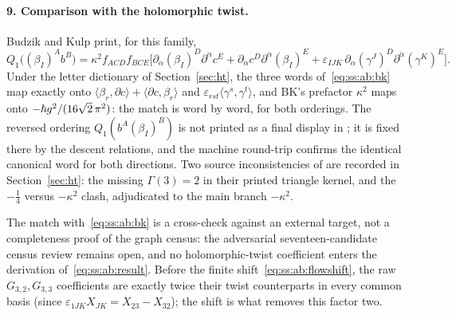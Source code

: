 \paragraph{9. Comparison with the holomorphic twist.} Budzik and Kulp print, for this family, \cite[eq.~(3.68)]{BK}
\begin{equation}\label{eq:ss:ab:bk}
Q_1\big((\beta_I)^{A}b^{B}\big)
=\kappa^{2}f_{ACD}f_{BCE}
\Big[\partial_{\dot\alpha}(\beta_I)^{D}\partial^{\dot\alpha}c^{E}
+\partial_{\dot\alpha}c^{D}\partial^{\dot\alpha}(\beta_I)^{E}
+\varepsilon_{IJK}\,\partial_{\dot\alpha}(\gamma^{J})^{D}
\partial^{\dot\alpha}(\gamma^{K})^{E}\Big] .
\end{equation}
Under the letter dictionary of Section~\ref{sec:ht}, the three words of~\eqref{eq:ss:ab:bk} map exactly onto $\langle\beta_r,\partial c\rangle+\langle\partial c,\beta_r\rangle$ and $\varepsilon_{rst}\langle\gamma^{s},\gamma^{t}\rangle$, and BK's prefactor $\kappa^{2}$ maps onto $-\hbar g^{2}/(16\sqrt2\,\pi^{2})$: the match is word by word, for both orderings. The reversed ordering $Q_1(b^{A}(\beta_I)^{B})$ is not printed as a final display in \cite{BK}; it is fixed there by the descent relations, and the machine round-trip confirms the identical canonical word for both directions. Two source inconsistencies of \cite{BK} are recorded in Section~\ref{sec:ht}: the missing $\Gamma(3)=2$ in their printed triangle kernel, and the $-\tfrac14$ versus $-\kappa^{2}$ clash, adjudicated to the main branch $-\kappa^{2}$.

\begin{remark}\label{rem:ss:ab:htstatus}
The match with~\eqref{eq:ss:ab:bk} is a cross-check against an external target, not a completeness proof of the graph census: the adversarial seventeen-candidate census review remains open, and no holomorphic-twist coefficient enters the derivation of~\eqref{eq:ss:ab:result}. Before the finite shift~\eqref{eq:ss:ab:flowshift}, the raw $G_{3,2},G_{3,3}$ coefficients are exactly twice their twist counterparts in every common basis (since $\varepsilon_{1JK}X_{JK}=X_{23}-X_{32}$); the shift is what removes this factor two.
\end{remark}
